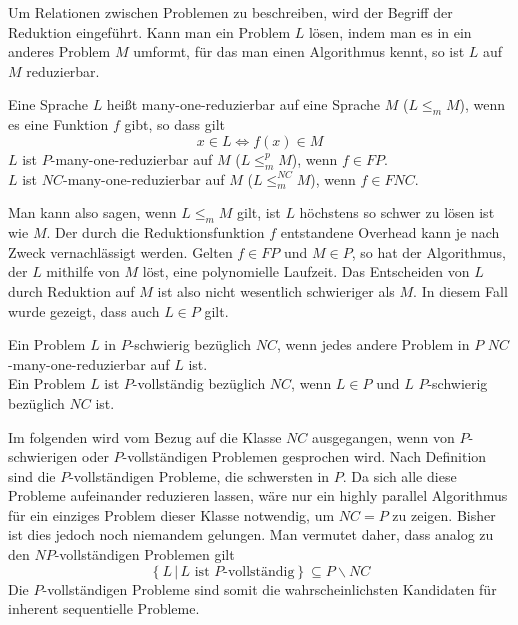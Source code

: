 Um Relationen zwischen Problemen zu beschreiben, wird der Begriff der
Reduktion eingeführt.
Kann man ein Problem $L$ lösen, indem man es in ein anderes Problem $M$ umformt,
für das man einen Algorithmus kennt, so ist $L$ auf $M$ reduzierbar.
%
\begin{define}
    Eine Sprache $L$ heißt many-one-reduzierbar auf eine Sprache $M$
    ($L \leq_m M$), wenn es eine Funktion $f$ gibt, so dass gilt
    \begin{equation}
        x \in L \Leftrightarrow f(x) \in M
    \end{equation}
    $L$ ist $P$-many-one-reduzierbar auf $M$ ($L \leq_m^p M$), wenn
    $f \in FP$. \\
    $L$ ist $NC$-many-one-reduzierbar auf $M$ ($L \leq_m^{NC} M$), wenn
    $f \in FNC$.
    \cite[S.47]{greenlaw}
\end{define}
%
Man kann also sagen, wenn $L \leq_m M$ gilt, ist $L$ höchstens so schwer zu
lösen ist wie $M$.
Der durch die Reduktionsfunktion $f$ entstandene Overhead kann je nach Zweck
vernachlässigt werden.
Gelten $f \in FP$ und $M \in P$, so hat der Algorithmus, der $L$ mithilfe von
$M$ löst, eine polynomielle Laufzeit.
Das Entscheiden von $L$ durch Reduktion auf $M$ ist also nicht wesentlich
schwieriger als $M$.
In diesem Fall wurde gezeigt, dass auch $L \in P$ gilt.

\begin{define}
    Ein Problem $L$ in $P$-schwierig bezüglich $NC$, wenn jedes andere Problem
    in $P$ $NC$-many-one-reduzierbar auf $L$ ist. \\
    Ein Problem $L$ ist $P$-vollständig bezüglich $NC$, wenn $L \in P$ und $L$
    $P$-schwierig bezüglich $NC$ ist.
\end{define}
Im folgenden wird vom Bezug auf die Klasse $NC$ ausgegangen, wenn von
$P$-schwierigen oder $P$-vollständigen Problemen gesprochen wird.
%
Nach Definition sind die $P$-vollständigen Probleme, die schwersten in $P$.
Da sich alle diese Probleme aufeinander reduzieren lassen, wäre nur ein highly
parallel Algorithmus für ein einziges Problem dieser Klasse notwendig, um
$NC = P$ zu zeigen.
Bisher ist dies jedoch noch niemandem gelungen.
Man vermutet daher, dass analog zu den $NP$-vollständigen Problemen gilt
\begin{equation}
    \left\{ L \, | \, L \text{ ist $P$-vollständig} \right\}
    \subseteq P \backslash NC
\end{equation}
Die $P$-vollständigen Probleme sind somit die wahrscheinlichsten Kandidaten
für inherent sequentielle Probleme.
\cite[S.54ff]{greenlaw}\cite[S.535]{jaja}

